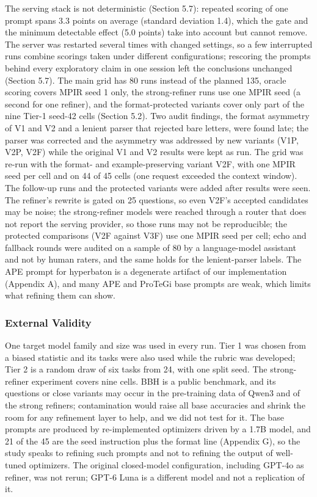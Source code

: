 \documentclass{ieeeaccess}
\begin{document}
The serving stack is not deterministic (Section 5.7): repeated scoring of one prompt spans 3.3 points on average (standard deviation 1.4), which the gate and the minimum detectable effect (5.0 points) take into account but cannot remove. The server was restarted several times with changed settings, so a few interrupted runs combine scorings taken under different configurations; rescoring the prompts behind every exploratory claim in one session left the conclusions unchanged (Section 5.7). The main grid has 80 runs instead of the planned 135, oracle scoring covers MPIR seed 1 only, the strong-refiner runs use one MPIR seed (a second for one refiner), and the format-protected variants cover only part of the nine Tier-1 seed-42 cells (Section 5.2). Two audit findings, the format asymmetry of V1 and V2 and a lenient parser that rejected bare letters, were found late; the parser was corrected and the asymmetry was addressed by new variants (V1P, V2P, V2F) while the original V1 and V2 results were kept as run. The grid was re-run with the format- and example-preserving variant V2F, with one MPIR seed per cell and on 44 of 45 cells (one request exceeded the context window). The follow-up runs and the protected variants were added after results were seen. The refiner's rewrite is gated on 25 questions, so even V2F's accepted candidates may be noise; the strong-refiner models were reached through a router that does not report the serving provider, so those runs may not be reproducible; the protected comparisons (V2F against V3F) use one MPIR seed per cell; echo and fallback rounds were audited on a sample of 80 by a language-model assistant and not by human raters, and the same holds for the lenient-parser labels. The APE prompt for hyperbaton is a degenerate artifact of our implementation (Appendix A), and many APE and ProTeGi base prompts are weak, which limits what refining them can show.

\subsubsection{External Validity}

One target model family and size was used in every run. Tier 1 was chosen from a biased statistic and its tasks were also used while the rubric was developed; Tier 2 is a random draw of six tasks from 24, with one split seed. The strong-refiner experiment covers nine cells. BBH is a public benchmark, and its questions or close variants may occur in the pre-training data of Qwen3 and of the strong refiners; contamination would raise all base accuracies and shrink the room for any refinement layer to help, and we did not test for it. The base prompts are produced by re-implemented optimizers driven by a 1.7B model, and 21 of the 45 are the seed instruction plus the format line (Appendix G), so the study speaks to refining such prompts and not to refining the output of well-tuned optimizers. The original closed-model configuration, including GPT-4o as refiner, was not rerun; GPT-6 Luna is a different model and not a replication of it.
\end{document}
